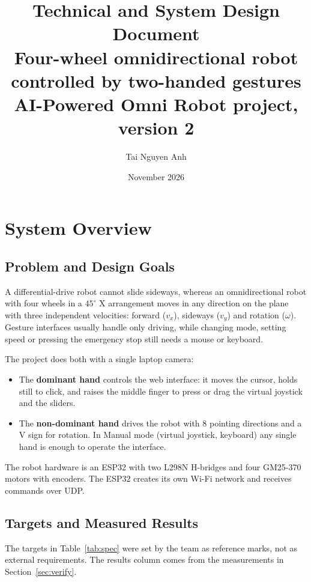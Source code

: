 \documentclass[11pt,a4paper]{article}
\title{\textbf{Technical and System Design Document}\\[4pt]
\large Four-wheel omnidirectional robot controlled by two-handed gestures\\
\normalsize AI-Powered Omni Robot project, version 2}
\author{Tai Nguyen Anh}
\date{November 2026}
\begin{document}
\maketitle
\tableofcontents
\newpage

\section{System Overview}
\subsection{Problem and Design Goals}
A differential-drive robot cannot slide sideways, whereas an omnidirectional robot with four wheels in a $45^\circ$ X arrangement moves in any direction on the plane with three independent velocities: forward ($v_x$), sideways ($v_y$) and rotation ($\omega$). Gesture interfaces usually handle only driving, while changing mode, setting speed or pressing the emergency stop still needs a mouse or keyboard.

The project does both with a single laptop camera:
\begin{itemize}
  \item The \textbf{dominant hand} controls the web interface: it moves the cursor, holds still to click, and raises the middle finger to press or drag the virtual joystick and the sliders.
  \item The \textbf{non-dominant hand} drives the robot with 8 pointing directions and a V sign for rotation. In Manual mode (virtual joystick, keyboard) any single hand is enough to operate the interface.
\end{itemize}
The robot hardware is an ESP32 with two L298N H-bridges and four GM25-370 motors with encoders. The ESP32 creates its own Wi-Fi network and receives commands over UDP.

\subsection{Targets and Measured Results}
The targets in Table~\ref{tab:spec} were set by the team as reference marks, not as external requirements. The results column comes from the measurements in Section~\ref{sec:verify}.
\end{document}
